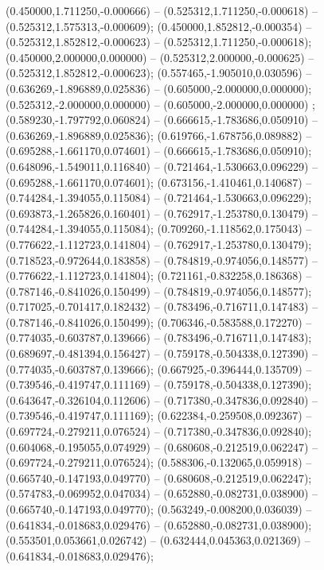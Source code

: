  (0.450000,1.711250,-0.000666) -- (0.525312,1.711250,-0.000618) -- (0.525312,1.575313,-0.000609);
 (0.450000,1.852812,-0.000354) -- (0.525312,1.852812,-0.000623) -- (0.525312,1.711250,-0.000618);
 (0.450000,2.000000,0.000000) -- (0.525312,2.000000,-0.000625) -- (0.525312,1.852812,-0.000623);
 (0.557465,-1.905010,0.030596) -- (0.636269,-1.896889,0.025836) -- (0.605000,-2.000000,0.000000);
 (0.525312,-2.000000,0.000000) -- (0.605000,-2.000000,0.000000) ;
 (0.589230,-1.797792,0.060824) -- (0.666615,-1.783686,0.050910) -- (0.636269,-1.896889,0.025836);
 (0.619766,-1.678756,0.089882) -- (0.695288,-1.661170,0.074601) -- (0.666615,-1.783686,0.050910);
 (0.648096,-1.549011,0.116840) -- (0.721464,-1.530663,0.096229) -- (0.695288,-1.661170,0.074601);
 (0.673156,-1.410461,0.140687) -- (0.744284,-1.394055,0.115084) -- (0.721464,-1.530663,0.096229);
 (0.693873,-1.265826,0.160401) -- (0.762917,-1.253780,0.130479) -- (0.744284,-1.394055,0.115084);
 (0.709260,-1.118562,0.175043) -- (0.776622,-1.112723,0.141804) -- (0.762917,-1.253780,0.130479);
 (0.718523,-0.972644,0.183858) -- (0.784819,-0.974056,0.148577) -- (0.776622,-1.112723,0.141804);
 (0.721161,-0.832258,0.186368) -- (0.787146,-0.841026,0.150499) -- (0.784819,-0.974056,0.148577);
 (0.717025,-0.701417,0.182432) -- (0.783496,-0.716711,0.147483) -- (0.787146,-0.841026,0.150499);
 (0.706346,-0.583588,0.172270) -- (0.774035,-0.603787,0.139666) -- (0.783496,-0.716711,0.147483);
 (0.689697,-0.481394,0.156427) -- (0.759178,-0.504338,0.127390) -- (0.774035,-0.603787,0.139666);
 (0.667925,-0.396444,0.135709) -- (0.739546,-0.419747,0.111169) -- (0.759178,-0.504338,0.127390);
 (0.643647,-0.326104,0.112606) -- (0.717380,-0.347836,0.092840) -- (0.739546,-0.419747,0.111169);
 (0.622384,-0.259508,0.092367) -- (0.697724,-0.279211,0.076524) -- (0.717380,-0.347836,0.092840);
 (0.604068,-0.195055,0.074929) -- (0.680608,-0.212519,0.062247) -- (0.697724,-0.279211,0.076524);
 (0.588306,-0.132065,0.059918) -- (0.665740,-0.147193,0.049770) -- (0.680608,-0.212519,0.062247);
 (0.574783,-0.069952,0.047034) -- (0.652880,-0.082731,0.038900) -- (0.665740,-0.147193,0.049770);
 (0.563249,-0.008200,0.036039) -- (0.641834,-0.018683,0.029476) -- (0.652880,-0.082731,0.038900);
 (0.553501,0.053661,0.026742) -- (0.632444,0.045363,0.021369) -- (0.641834,-0.018683,0.029476);
